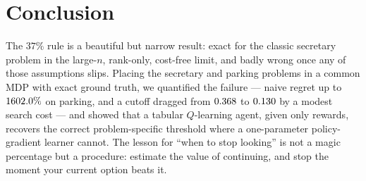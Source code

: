 \section{Conclusion}
The $37\%$ rule is a beautiful but narrow result: exact for the classic
secretary problem in the large-$n$, rank-only, cost-free limit, and badly wrong
once any of those assumptions slips. Placing the secretary and parking problems
in a common MDP with exact ground truth, we quantified the failure --- naive
regret up to $1602.0\%$ on parking, and a cutoff dragged from
$0.368$ to $0.130$ by a modest search cost --- and showed that a
tabular $Q$-learning agent, given only rewards, recovers the correct
problem-specific threshold where a one-parameter policy-gradient learner cannot.
The lesson for ``when to stop looking'' is not a magic percentage but a
procedure: estimate the value of continuing, and stop the moment your current
option beats it.
